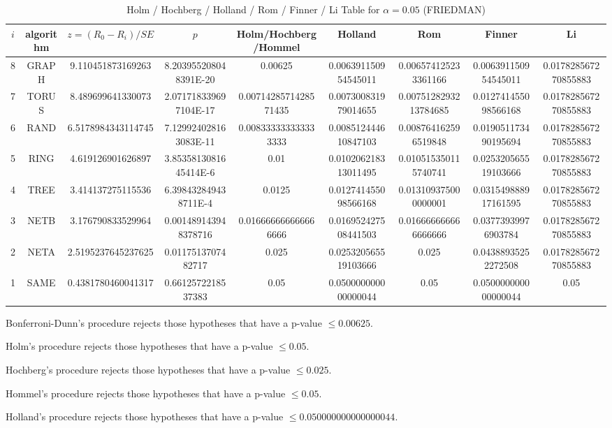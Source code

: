\documentclass[a4paper,10pt]{article}
\begin{document}
\begin{landscape}
\begin{table}[!htp]
\begin{tabular}{
|r|r|r|r|r|r|r|r|r|r|}
\end{tabular}
\end{table}

\newpage

\begin{table}[!htp]
\centering\scriptsize
\caption{Holm / Hochberg / Holland / Rom / Finner / Li Table for $\alpha=0.05$ (FRIEDMAN)}
\begin{tabular}{ccccccccc}
$i$&algorithm&$z=(R_0 - R_i)/SE$&$p$&Holm/Hochberg/Hommel&Holland&Rom&Finner&Li\\
\hline
8& GRAPH&9.110451873169263&8.203955208048391E-20&0.00625&0.006391150954545011&0.006574125233361166&0.006391150954545011&0.017828567270855883\\
7& TORUS&8.489699641330073&2.071718339697104E-17&0.0071428571428571435&0.007300831979014655&0.0075128293213784685&0.012741455098566168&0.017828567270855883\\
6& RAND&6.5178984343114745&7.129924028163083E-11&0.008333333333333333&0.008512444610847103&0.008764162596519848&0.019051173490195694&0.017828567270855883\\
5& RING&4.619126901626897&3.8535813081645414E-6&0.01&0.010206218313011495&0.010515350115740741&0.025320565519103666&0.017828567270855883\\
4& TREE&3.414137275115536&6.398432849438711E-4&0.0125&0.012741455098566168&0.013109375000000001&0.031549888917161595&0.017828567270855883\\
3& NETB&3.176790833529964&0.001489143948378716&0.016666666666666666&0.016952427508441503&0.016666666666666666&0.03773939976903784&0.017828567270855883\\
2& NETA&2.5195237645237625&0.0117513707482717&0.025&0.025320565519103666&0.025&0.04388935252272508&0.017828567270855883\\
1& SAME&0.4381780460041317&0.6612572218537383&0.05&0.050000000000000044&0.05&0.050000000000000044&0.05\\
\hline
\end{tabular}
\end{table}
Bonferroni-Dunn's procedure rejects those hypotheses that have a p-value $\le0.00625$.


Holm's procedure rejects those hypotheses that have a p-value $\le0.05$.


Hochberg's procedure rejects those hypotheses that have a p-value $\le0.025$.


Hommel's procedure rejects those hypotheses that have a p-value $\le0.05$.


Holland's procedure rejects those hypotheses that have a p-value $\le0.050000000000000044$.



\end{landscape}
\end{document}
